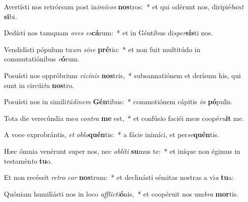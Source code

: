 \item Avertísti nos retrórsum post in\textit{i}\textit{mí}\textit{cos} \textbf{nos}tros:~* et qui odérunt nos, diripié\textit{bant} \textbf{si}bi.
\item Dedísti nos tamquam \textit{o}\textit{ves} \textit{es}\textbf{cá}rum:~* et in Géntibus di\textit{sper}\textbf{sís}ti nos.
\item Vendidísti pópulum tu\textit{um} \textit{si}\textit{ne} \textbf{pré}tio:~* et non fuit multitúdo in commutatiónibus \textit{e}\textbf{ó}rum.
\item Posuísti nos oppróbrium \textit{vi}\textit{cí}\textit{nis} \textbf{nos}tris,~* subsannatiónem et derísum his, qui sunt in circúi\textit{tu} \textbf{nos}tro.
\item Posuísti nos in simili\textit{tú}\textit{di}\textit{nem} \textbf{Gén}tibus:~* commotiónem cápitis \textit{in} \textbf{pó}pulis.
\item Tota die verecúndia me\textit{a} \textit{con}\textit{tra} \textbf{me} est,~* et confúsio faciéi meæ coopé\textit{ru}\textbf{it} me.
\item A voce exprobrántis, \textit{et} \textit{ob}\textit{lo}\textbf{quén}tis:~* a fácie inimíci, et per\textit{se}\textbf{quén}tis.
\item Hæc ómnia venérunt super nos, nec \textit{ob}\textit{lí}\textit{ti} \textbf{su}mus te:~* et iníque non égimus in testamén\textit{to} \textbf{tu}o.
\item Et non recéssit \textit{re}\textit{tro} \textit{cor} \textbf{nos}trum:~* et declinásti sémitas nostras a vi\textit{a} \textbf{tu}a:
\item Quóniam humiliásti nos in loco \textit{af}\textit{flic}\textit{ti}\textbf{ó}nis,~* et coopéruit nos um\textit{bra} \textbf{mor}tis.

